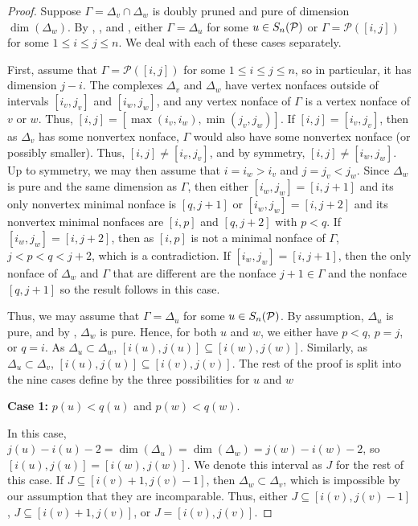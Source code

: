 \begin{proof}   
    Suppose $\Gamma = \Delta_v\cap \Delta_w$ is doubly pruned and pure of dimension $\dim(\Delta_w)$. 
    By , , and , either $\Gamma = \Delta_u$ for some $u\in S_n(\mathcal{P})$ or $\Gamma = \mathscr{P}([i,j])$ for some $1\leq i \leq j \leq n$.
    We deal with each of these cases separately.

    First, assume that $\Gamma = \mathscr{P}([i,j])$ for some $1\leq i \leq j \leq n$, so in particular, it has dimension $j-i.$
    The complexes $\Delta_v$ and $\Delta_w$ have vertex nonfaces outside of intervals $[i_v,j_v]$ and $[i_w,j_w]$, and any vertex nonface of $\Gamma$ is a vertex nonface of $v$ or $w$.
    Thus, $[i,j] =[\max(i_v,i_w),\min(j_v,j_w)]$.
    If $[i,j] = [i_v,j_v]$, then as $\Delta_v$ has some nonvertex nonface, $\Gamma$ would also have some nonvertex nonface (or possibly smaller).
    Thus, $[i,j] \neq [i_v,j_v]$, and by symmetry, $[i,j] \neq [i_w,j_w]$.
    Up to symmetry, we may then assume that $i = i_w >i_v$ and $j = j_v <j_w$.
    Since $\Delta_w$ is pure and the same dimension as $\Gamma$, then either $[i_w,j_w] = [i,j+1]$ and its only nonvertex minimal nonface is $[q,j+1]$ or $[i_w,j_w] = [i,j+2]$ and its nonvertex minimal nonfaces are $[i,p]$ and $[q,j+2]$ with $p<q$.
    If $[i_w,j_w] = [i,j+2]$, then as $[i,p]$ is not a minimal nonface of $\Gamma$, $j<p<q<j+2$, which is a contradiction.
    If $[i_w,j_w] = [i,j+1]$, then the only nonface of $\Delta_w$ and $\Gamma$ that are different are the nonface $j+1 \in \Gamma$ and the nonface $[q,j+1]$ so the result follows in this case.
    
    Thus, we may assume that $\Gamma = \Delta_u$ for some $u\in S_n(\mathcal{P})$.
    By assumption, $\Delta_u$ is pure, and by , $\Delta_w$ is pure. 
    Hence, for both $u$ and $w$, we either have $p<q$, $p =j$, or $q=i$.
    As $\Delta_u \subset \Delta_w$, $[i(u),j(u)]\subseteq [i(w),j(w)]$. 
    Similarly, as $\Delta_u \subset \Delta_v$, $[i(u),j(u)]\subseteq [i(v),j(v)]$.
    The rest of the proof is split into the nine cases define by the three possibilities for $u$ and $w$

    \medskip

    \noindent\textbf{Case 1:} $p(u)<q(u)$ and $p(w)<q(w)$.

    \medskip
    
    In this case,  $j(u)-i(u)-2 = \dim(\Delta_u) = \dim(\Delta_w) = j(w)-i(w)-2$, so $[i(u),j(u)] = [i(w),j(w)]$.
    We denote this interval as $J$ for the rest of this case.
    If $J \subseteq [i(v)+1,j(v)-1]$, then $\Delta_w\subset \Delta_v$, which is impossible by our assumption that they are incomparable. 
    Thus, either $J \subseteq [i(v),j(v)-1]$, $J \subseteq [i(v)+1,j(v)]$, or $J=[i(v),j(v)]$.
    

\end{proof}
